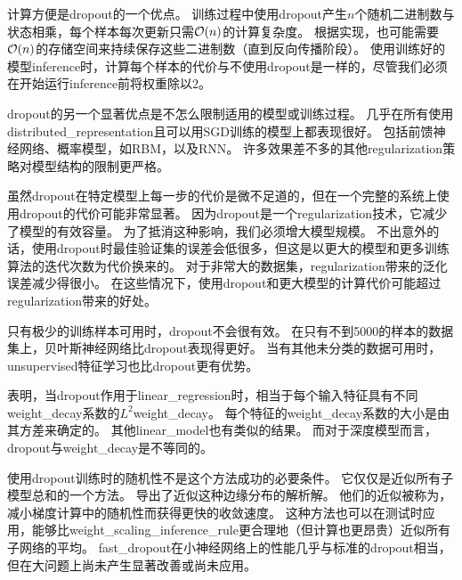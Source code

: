 计算方便是\gls{dropout}的一个优点。
训练过程中使用\gls{dropout}产生$n$个随机二进制数与状态相乘，每个样本每次更新只需$\mathcal{O}(n)$的计算复杂度。
根据实现，也可能需要$\mathcal{O}(n)$的存储空间来持续保存这些二进制数（直到反向传播阶段）。
使用训练好的模型\gls{inference}时，计算每个样本的代价与不使用\gls{dropout}是一样的，尽管我们必须在开始运行\gls{inference}前将权重除以2。


\gls{dropout}的另一个显著优点是不怎么限制适用的模型或训练过程。
几乎在所有使用\gls{distributed_representation}且可以用\gls{SGD}训练的模型上都表现很好。
包括前馈神经网络、概率模型，如\gls{RBM}\citep{Srivastava14}，以及\gls{RNN}\citep{Bayer-et-al-arXiv-2014,Pascanu-et-al-ICLR2014}。
许多效果差不多的其他\gls{regularization}策略对模型结构的限制更严格。

虽然\gls{dropout}在特定模型上每一步的代价是微不足道的，但在一个完整的系统上使用\gls{dropout}的代价可能非常显著。
因为\gls{dropout}是一个\gls{regularization}技术，它减少了模型的有效容量。
为了抵消这种影响，我们必须增大模型规模。
不出意外的话，使用\gls{dropout}时最佳验证集的误差会低很多，但这是以更大的模型和更多训练算法的迭代次数为代价换来的。
对于非常大的数据集，\gls{regularization}带来的泛化误差减少得很小。
在这些情况下，使用\gls{dropout}和更大模型的计算代价可能超过\gls{regularization}带来的好处。

只有极少的训练样本可用时，\gls{dropout}不会很有效。
在只有不到5000的样本的数据集上\citep{Xiong2011}，贝叶斯神经网络\citep{Neal1996}比\gls{dropout}表现得更好\citep{Srivastava14}。
当有其他未分类的数据可用时，\gls{unsupervised}特征学习也比\gls{dropout}更有优势。


\cite{Wager+al-2013}表明，当\gls{dropout}作用于\gls{linear_regression}时，相当于每个输入特征具有不同\gls{weight_decay}系数的$L^2$\gls{weight_decay}。 每个特征的\gls{weight_decay}系数的大小是由其方差来确定的。
其他\gls{linear_model}也有类似的结果。
而对于深度模型而言，\gls{dropout}与\gls{weight_decay}是不等同的。


使用\gls{dropout}训练时的随机性不是这个方法成功的必要条件。
它仅仅是近似所有子模型总和的一个方法。
\cite{WangManning-ICML2013-small}导出了近似这种边缘分布的解析解。
他们的近似被称为，减小梯度计算中的随机性而获得更快的收敛速度。
这种方法也可以在测试时应用，能够比\gls{weight_scaling_inference_rule}更合理地（但计算也更昂贵）近似所有子网络的平均。
\gls{fast_dropout}在小神经网络上的性能几乎与标准的\gls{dropout}相当，但在大问题上尚未产生显著改善或尚未应用。

